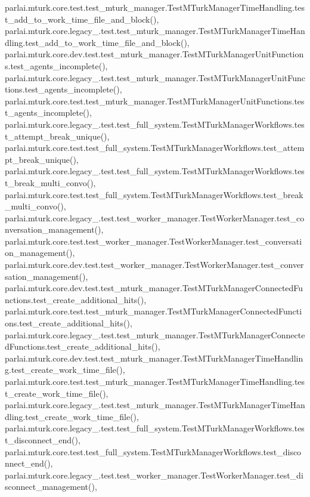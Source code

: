 parlai.\+mturk.\+core.\+test.\+test\+\_\+mturk\+\_\+manager.\+Test\+M\+Turk\+Manager\+Time\+Handling.\+test\+\_\+add\+\_\+to\+\_\+work\+\_\+time\+\_\+file\+\_\+and\+\_\+block(), parlai.\+mturk.\+core.\+legacy\+\_.\+test.\+test\+\_\+mturk\+\_\+manager.\+Test\+M\+Turk\+Manager\+Time\+Handling.\+test\+\_\+add\+\_\+to\+\_\+work\+\_\+time\+\_\+file\+\_\+and\+\_\+block(), parlai.\+mturk.\+core.\+dev.\+test.\+test\+\_\+mturk\+\_\+manager.\+Test\+M\+Turk\+Manager\+Unit\+Functions.\+test\+\_\+agents\+\_\+incomplete(), parlai.\+mturk.\+core.\+legacy\+\_.\+test.\+test\+\_\+mturk\+\_\+manager.\+Test\+M\+Turk\+Manager\+Unit\+Functions.\+test\+\_\+agents\+\_\+incomplete(), parlai.\+mturk.\+core.\+test.\+test\+\_\+mturk\+\_\+manager.\+Test\+M\+Turk\+Manager\+Unit\+Functions.\+test\+\_\+agents\+\_\+incomplete(), parlai.\+mturk.\+core.\+legacy\+\_.\+test.\+test\+\_\+full\+\_\+system.\+Test\+M\+Turk\+Manager\+Workflows.\+test\+\_\+attempt\+\_\+break\+\_\+unique(), parlai.\+mturk.\+core.\+test.\+test\+\_\+full\+\_\+system.\+Test\+M\+Turk\+Manager\+Workflows.\+test\+\_\+attempt\+\_\+break\+\_\+unique(), parlai.\+mturk.\+core.\+legacy\+\_.\+test.\+test\+\_\+full\+\_\+system.\+Test\+M\+Turk\+Manager\+Workflows.\+test\+\_\+break\+\_\+multi\+\_\+convo(), parlai.\+mturk.\+core.\+test.\+test\+\_\+full\+\_\+system.\+Test\+M\+Turk\+Manager\+Workflows.\+test\+\_\+break\+\_\+multi\+\_\+convo(), parlai.\+mturk.\+core.\+legacy\+\_.\+test.\+test\+\_\+worker\+\_\+manager.\+Test\+Worker\+Manager.\+test\+\_\+conversation\+\_\+management(), parlai.\+mturk.\+core.\+test.\+test\+\_\+worker\+\_\+manager.\+Test\+Worker\+Manager.\+test\+\_\+conversation\+\_\+management(), parlai.\+mturk.\+core.\+dev.\+test.\+test\+\_\+worker\+\_\+manager.\+Test\+Worker\+Manager.\+test\+\_\+conversation\+\_\+management(), parlai.\+mturk.\+core.\+dev.\+test.\+test\+\_\+mturk\+\_\+manager.\+Test\+M\+Turk\+Manager\+Connected\+Functions.\+test\+\_\+create\+\_\+additional\+\_\+hits(), parlai.\+mturk.\+core.\+test.\+test\+\_\+mturk\+\_\+manager.\+Test\+M\+Turk\+Manager\+Connected\+Functions.\+test\+\_\+create\+\_\+additional\+\_\+hits(), parlai.\+mturk.\+core.\+legacy\+\_.\+test.\+test\+\_\+mturk\+\_\+manager.\+Test\+M\+Turk\+Manager\+Connected\+Functions.\+test\+\_\+create\+\_\+additional\+\_\+hits(), parlai.\+mturk.\+core.\+dev.\+test.\+test\+\_\+mturk\+\_\+manager.\+Test\+M\+Turk\+Manager\+Time\+Handling.\+test\+\_\+create\+\_\+work\+\_\+time\+\_\+file(), parlai.\+mturk.\+core.\+test.\+test\+\_\+mturk\+\_\+manager.\+Test\+M\+Turk\+Manager\+Time\+Handling.\+test\+\_\+create\+\_\+work\+\_\+time\+\_\+file(), parlai.\+mturk.\+core.\+legacy\+\_.\+test.\+test\+\_\+mturk\+\_\+manager.\+Test\+M\+Turk\+Manager\+Time\+Handling.\+test\+\_\+create\+\_\+work\+\_\+time\+\_\+file(), parlai.\+mturk.\+core.\+legacy\+\_.\+test.\+test\+\_\+full\+\_\+system.\+Test\+M\+Turk\+Manager\+Workflows.\+test\+\_\+disconnect\+\_\+end(), parlai.\+mturk.\+core.\+test.\+test\+\_\+full\+\_\+system.\+Test\+M\+Turk\+Manager\+Workflows.\+test\+\_\+disconnect\+\_\+end(), parlai.\+mturk.\+core.\+legacy\+\_.\+test.\+test\+\_\+worker\+\_\+manager.\+Test\+Worker\+Manager.\+test\+\_\+disconnect\+\_\+management(), 